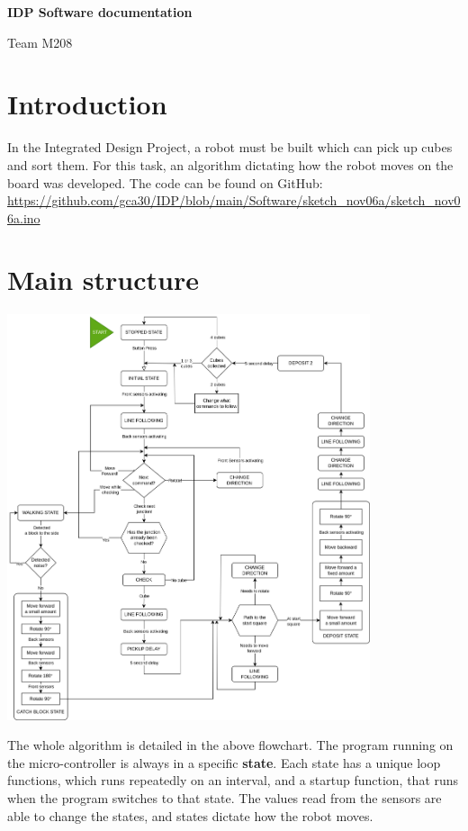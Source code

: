 \documentclass[11pt,a4paper,twoside]{article}
\begin{document}
\begin{center}
    \Large{\textbf{IDP Software documentation}}
    
    \Large{Team M208}
\end{center}
\vspace{0.05cm}

\section{Introduction}

In the Integrated Design Project, a robot must be built which can pick up cubes and sort them. For this task,
an algorithm dictating how the robot moves on the board was developed. 
The code can be found on GitHub: \url{https://github.com/gca30/IDP/blob/main/Software/sketch_nov06a/sketch_nov06a.ino}


\section{Main structure}

\begin{center}
    \includegraphics[width=0.8\textwidth]{flowchart}
\end{center}

The whole algorithm is detailed in the above flowchart. The program running on the micro-controller
is always in a specific \textbf{state}. Each state has a unique loop functions, which
runs repeatedly on an interval, and a startup function, that runs when the program switches to that state.
The values read from the sensors are able to change the states, and
states dictate how the robot moves.
\end{document}
